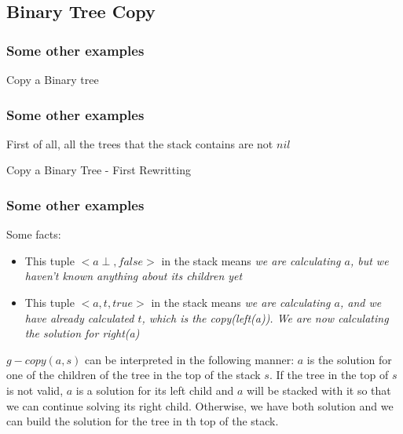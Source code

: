 \documentclass{beamer}
\begin{document}
\subsection{Binary Tree Copy}
\begin{frame}
	\frametitle{Some other examples}
	\begin{block}{Copy a Binary tree}
		\begin{algorithmic}[1]
					\State {}
				\Else
					\State {}
				\EndIf
			\EndProcedure
		\end{algorithmic}
	\end{block}
\end{frame}
\begin{frame}
	\frametitle{Some other examples}
	First of all, all the trees that the stack contains are not $nil$
	\begin{block}{Copy a Binary Tree - First Rewritting}
		\tiny
		\begin{algorithmic}[1]
					\State {}
				\Else
						\State{}
					\Else
						\State{}
					\EndIf
				\EndIf
			\EndProcedure
		\end{algorithmic}
	\end{block}
\end{frame}
\begin{frame}
	\frametitle{Some other examples}
	Some facts:
	\begin{itemize}
		\item This tuple $<a \perp, false>$ in the stack means \textit{we are calculating $a$, but we haven't known anything about its children yet}
		\item This tuple $<a,t,true>$ in the stack means \textit{we are calculating $a$, and we have already calculated $t$, which is the copy(left(a)). We are now calculating the solution for right(a)}
	\end{itemize}
	$g-copy(a,s)$ can be interpreted in the following manner: $a$ is the solution for one of the children of the tree in the top of the stack $s$. If the tree in the top of $s$ is not valid, $a$ is a solution for its left child and $a$ will be stacked with it so that we can continue solving its right child. Otherwise, we have both solution and we can build the solution for the tree in th top of the stack.
\end{frame}
\end{document}
